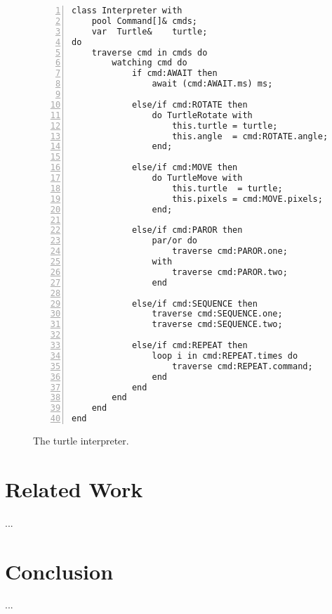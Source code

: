 \documentclass{acm_proc_article-sp}
\begin{document}
\begin{figure}%
\begin{lstlisting}[numbers=left,xleftmargin=3em]
class Interpreter with
    pool Command[]& cmds;
    var  Turtle&    turtle;
do
    traverse cmd in cmds do
        watching cmd do
            if cmd:AWAIT then
                await (cmd:AWAIT.ms) ms;

            else/if cmd:ROTATE then
                do TurtleRotate with
                    this.turtle = turtle;
                    this.angle  = cmd:ROTATE.angle;
                end;

            else/if cmd:MOVE then
                do TurtleMove with
                    this.turtle  = turtle;
                    this.pixels = cmd:MOVE.pixels;
                end;

            else/if cmd:PAROR then
                par/or do
                    traverse cmd:PAROR.one;
                with
                    traverse cmd:PAROR.two;
                end

            else/if cmd:SEQUENCE then
                traverse cmd:SEQUENCE.one;
                traverse cmd:SEQUENCE.two;

            else/if cmd:REPEAT then
                loop i in cmd:REPEAT.times do
                    traverse cmd:REPEAT.command;
                end
            end
        end
    end
end
\end{lstlisting}
\caption{ The turtle interpreter.
\label{lst.turtle.interpreter}
}
\end{figure}

\section{Related Work}

...

\section{Conclusion}

...



\balancecolumns
\end{document}
